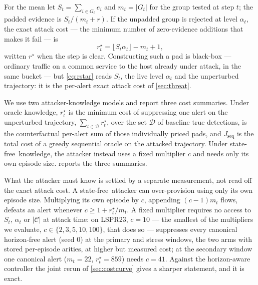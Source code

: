 \documentclass[conference]{IEEEtran}
\newcommand{\Cal}{\mathcal{C}}
\newcommand{\nCal}{\lvert\Cal\rvert}
\newcommand{\alphat}{\alpha_t}
\newcommand{\statefree}{state\nobreakdash-free}
\begin{document}
For the mean let $S_t=\sum_{i\in G_t}e_i$ and $m_t=\lvert G_t\rvert$ for the group tested at step
$t$; the padded evidence is $S_t/(m_t+r)$. If the unpadded group is rejected at level $\alphat$, the
exact attack cost --- the minimum number of zero-evidence additions that makes it fail --- is
\begin{equation}\label{eq:rstar}
r^{\star}_t=\lfloor S_t\alphat\rfloor-m_t+1 ,
\end{equation}
written $r^{\star}$ when the step is clear. Constructing such a pad is black-box --- ordinary traffic on
a common service to the host already under attack, in the same bucket --- but \eqref{eq:rstar} reads
$S_t$, the live level $\alphat$ and the unperturbed trajectory: it is the per-alert exact attack cost
of \cref{sec:threat}.

We use two attacker-knowledge models and report three cost summaries. Under oracle knowledge,
$r^{\star}_t$ is the minimum cost of suppressing one alert on the unperturbed trajectory,
$\sum_{t\in\mathcal D} r^{\star}_t$, over the set $\mathcal D$ of baseline true detections, is the
counterfactual per-alert sum of those individually priced pads, and
$J_{\mathrm{seq}}$ is the total cost of a greedy sequential oracle on the attacked trajectory. Under
\statefree\ knowledge, the attacker instead uses a fixed multiplier $c$ and needs only its own episode
size.  reports the three summaries.

What the attacker must know is settled by a separate measurement, not read off the exact attack cost.
A \statefree\ attacker can over-provision using only its own episode size. Multiplying its own episode
by $c$, appending $(c-1)m_t$ flows, defeats an alert whenever $c\ge1+r^{\star}_t/m_t$. A fixed multiplier
requires no access to $S_t$, $\alphat$ or $\nCal$ at attack time: on LSPR23, $c=10$ --- the smallest of
the multipliers we evaluate, $c\in\{2,3,5,10,100\}$, that does so --- suppresses every canonical
horizon-free alert (seed 0) at the primary and stress windows, the two arms with stored per-episode arities, at higher but measured
cost; at the secondary window one canonical alert ($m_t=22$, $r^{\star}_t=859$) needs $c=41$. Against the
horizon-aware controller the joint rerun of \cref{sec:costcurve} gives a sharper statement, and it is
exact.
\end{document}
